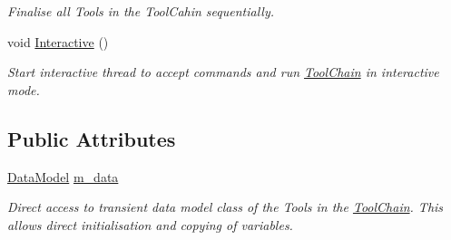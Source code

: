 \begin{DoxyCompactItemize}
\begin{DoxyCompactList}\small\item\em Finalise all Tools in the Tool\-Cahin sequentially. \end{DoxyCompactList}\item 
\hypertarget{classToolChain_a9bb47b83b6b85c3b0fab75af0cda19bf}{void \hyperlink{classToolChain_a9bb47b83b6b85c3b0fab75af0cda19bf}{Interactive} ()}\label{classToolChain_a9bb47b83b6b85c3b0fab75af0cda19bf}

\begin{DoxyCompactList}\small\item\em Start interactive thread to accept commands and run \hyperlink{classToolChain}{Tool\-Chain} in interactive mode. \end{DoxyCompactList}\end{DoxyCompactItemize}
\subsection*{Public Attributes}
\begin{DoxyCompactItemize}
\item 
\hypertarget{classToolChain_a92c81316d0c0b16ee9e4a084dd976f83}{\hyperlink{classDataModel}{Data\-Model} \hyperlink{classToolChain_a92c81316d0c0b16ee9e4a084dd976f83}{m\-\_\-data}}\label{classToolChain_a92c81316d0c0b16ee9e4a084dd976f83}

\begin{DoxyCompactList}\small\item\em Direct access to transient data model class of the Tools in the \hyperlink{classToolChain}{Tool\-Chain}. This allows direct initialisation and copying of variables. \end{DoxyCompactList}\end{DoxyCompactItemize}
